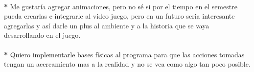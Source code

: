 \documentclass{article}
\begin{document}
\\
\textbf{*} Me gustaría agregar animaciones, pero no sé si por el tiempo en el semestre pueda crearlas e integrarle al video juego, pero en un futuro seria interesante agregarlas y así darle un plus al ambiente y a la historia que se vaya desarrollando en el juego.\\
\\

\textbf{*} Quiero implementarle bases físicas al programa para que las acciones tomadas tengan un acercamiento mas a la realidad y no se vea como algo tan poco posible.\\
\end{document}
